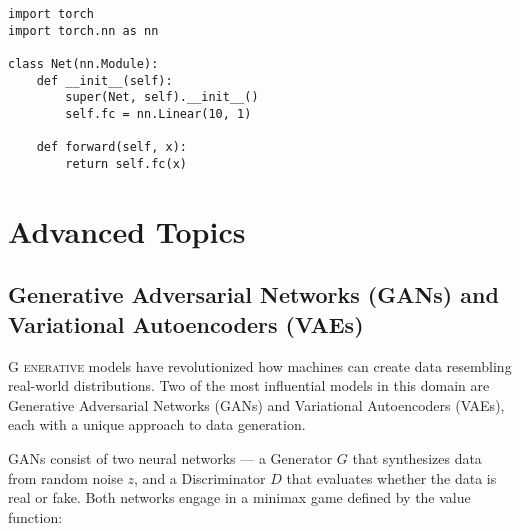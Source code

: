 \documentclass{book}
\begin{document}
\begin{lstlisting}[style=mystyle, caption={A simple neural net in PyTorch}]
import torch
import torch.nn as nn

class Net(nn.Module):
    def __init__(self):
        super(Net, self).__init__()
        self.fc = nn.Linear(10, 1)

    def forward(self, x):
        return self.fc(x)
\end{lstlisting}

\chapter{Advanced Topics}

\section{Generative Adversarial Networks (GANs) and Variational Autoencoders (VAEs)}

\lettrine{G}{ enerative} models have revolutionized how machines can create data resembling real-world distributions. Two of the most influential models in this domain are Generative Adversarial Networks (GANs) and Variational Autoencoders (VAEs), each with a unique approach to data generation.

\vspace{0.5cm}
\begin{center}
\end{center}

\vspace{0.5cm}
GANs consist of two neural networks — a Generator \(G\) that synthesizes data from random noise \(z\), and a Discriminator \(D\) that evaluates whether the data is real or fake. Both networks engage in a minimax game defined by the value function:
\end{document}
